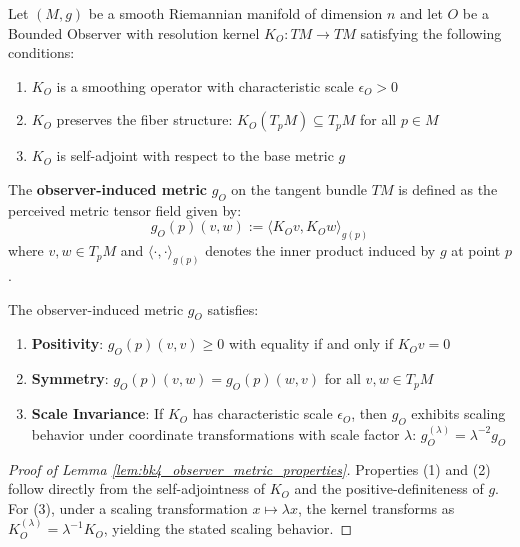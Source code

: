 \begin{definition}\label{def:bk4_observer_metric}
Let $(M, g)$ be a smooth Riemannian manifold of dimension $n$ and let $O$ be a Bounded Observer with resolution kernel $K_O: TM \to TM$ satisfying the following conditions:
\begin{enumerate}
    \item $K_O$ is a smoothing operator with characteristic scale $\epsilon_O > 0$
    \item $K_O$ preserves the fiber structure: $K_O(T_pM) \subseteq T_pM$ for all $p \in M$
    \item $K_O$ is self-adjoint with respect to the base metric $g$
\end{enumerate}
The \textbf{observer-induced metric} $g_O$ on the tangent bundle $TM$ is defined as the perceived metric tensor field given by:
\begin{equation}
    g_O(p)(v, w) := \langle K_O v, K_O w \rangle_{g(p)}
\end{equation}
where $v, w \in T_pM$ and $\langle \cdot, \cdot \rangle_{g(p)}$ denotes the inner product induced by $g$ at point $p$.
\end{definition}

\begin{lemma}\label{lem:bk4_observer_metric_properties}
The observer-induced metric $g_O$ satisfies:
\begin{enumerate}
    \item \textbf{Positivity}: $g_O(p)(v,v) \geq 0$ with equality if and only if $K_O v = 0$
    \item \textbf{Symmetry}: $g_O(p)(v,w) = g_O(p)(w,v)$ for all $v,w \in T_pM$
    \item \textbf{Scale Invariance}: If $K_O$ has characteristic scale $\epsilon_O$, then $g_O$ exhibits scaling behavior under coordinate transformations with scale factor $\lambda$: $g_O^{(\lambda)} = \lambda^{-2} g_O$
\end{enumerate}
\end{lemma}

\begin{proof}[Proof of Lemma \ref{lem:bk4_observer_metric_properties}]
Properties (1) and (2) follow directly from the self-adjointness of $K_O$ and the positive-definiteness of $g$. For (3), under a scaling transformation $x \mapsto \lambda x$, the kernel transforms as $K_O^{(\lambda)} = \lambda^{-1} K_O$, yielding the stated scaling behavior.
\end{proof}

